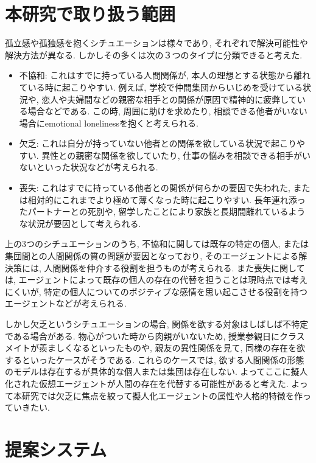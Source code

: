 \documentclass[a4paper,dvipdfmx]{hisken}
\begin{document}
\section{本研究で取り扱う範囲}
孤立感や孤独感を抱くシチュエーションは様々であり, それぞれで解決可能性や解決方法が異なる. しかしその多くは次の３つのタイプに分類できると考えた.

\begin{itemize}
\item 不協和: これはすでに持っている人間関係が, 本人の理想とする状態から離れている時に起こりやすい. 例えば, 学校で仲間集団からいじめを受けている状況や, 恋人や夫婦間などの親密な相手との関係が原因で精神的に疲弊している場合などである. この時, 周囲に助けを求めたり, 相談できる他者がいない場合にemotional lonelinessを抱くと考えられる.
\item 欠乏: これは自分が持っていない他者との関係を欲している状況で起こりやすい. 異性との親密な関係を欲していたり, 仕事の悩みを相談できる相手がいないといった状況などが考えられる.
\item 喪失: これはすでに持っている他者との関係が何らかの要因で失われた, または相対的にこれまでより極めて薄くなった時に起こりやすい. 長年連れ添ったパートナーとの死別や, 留学したことにより家族と長期間離れているような状況が要因として考えられる.
\end{itemize}

上の3つのシチュエーションのうち, 不協和に関しては既存の特定の個人, または集団間との人間関係の質の問題が要因となっており, そのエージェントによる解決策には, 人間関係を仲介する役割を担うものが考えられる. また喪失に関しては, エージェントによって既存の個人の存在の代替を担うことは現時点では考えにくいが, 特定の個人についてのポジティブな感情を思い起こさせる役割を持つエージェントなどが考えられる. 

しかし欠乏というシチュエーションの場合, 関係を欲する対象はしばしば不特定である場合がある. 物心がついた時から肉親がいないため, 授業参観日にクラスメイトが羨ましくなるといったものや, 親友の異性関係を見て, 同様の存在を欲するといったケースがそうである. これらのケースでは, 欲する人間関係の形態のモデルは存在するが具体的な個人または集団は存在しない. よってここに擬人化された仮想エージェントが人間の存在を代替する可能性があると考えた. よって本研究では欠乏に焦点を絞って擬人化エージェントの属性や人格的特徴を作っていきたい.



\section{提案システム}
\end{document}
